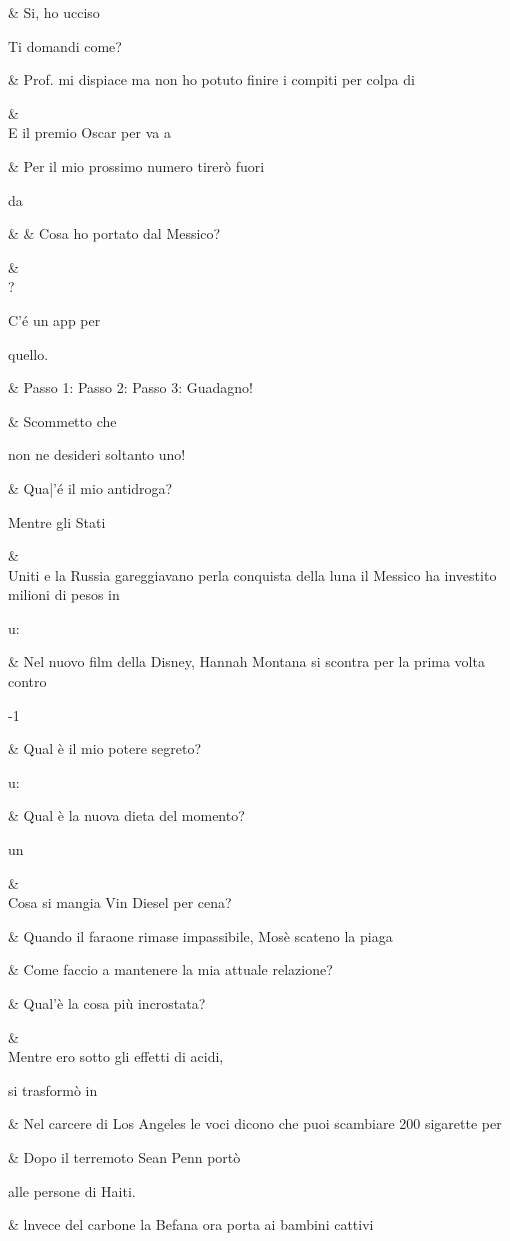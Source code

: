 &
Si, ho ucciso

Ti domandi
come?

&
Prof. mi dispiace
ma non ho
potuto finire i
compiti per colpa
di

&
\\
E il premio Oscar
per
va a

&
Per il mio
prossimo
numero tirerò
fuori

da

&
&
Cosa ho portato
dal Messico?

&
\\
?

C’é un app per

quello.

&
Passo 1:
Passo 2:
Passo 3:
Guadagno!

&
Scommetto che

non ne desideri
soltanto uno!

&
Qua|’é il mio
antidroga?

Mentre gli Stati

&
\\
Uniti e la Russia
gareggiavano perla
conquista della luna il
Messico ha investito
milioni di pesos in

u:

&
Nel nuovo film
della Disney,
Hannah Montana
si scontra per la
prima volta contro

-1

&
Qual è il mio
potere segreto?

u:

&
Qual è la
nuova dieta del
momento?

un

&
\\
Cosa si mangia
Vin Diesel per
cena?

&
Quando il
faraone rimase
impassibile,
Mosè scateno la
piaga

&
Come faccio
a mantenere
la mia attuale
relazione?

&
Qual’è la cosa
più incrostata?

&
\\
Mentre ero
sotto gli effetti
di acidi,

si trasformò in

&
Nel carcere di
Los Angeles le
voci dicono che
puoi scambiare
200 sigarette per

&
Dopo il
terremoto Sean
Penn portò

alle
persone di Haiti.

&
lnvece del
carbone la
Befana ora porta
ai bambini cattivi

